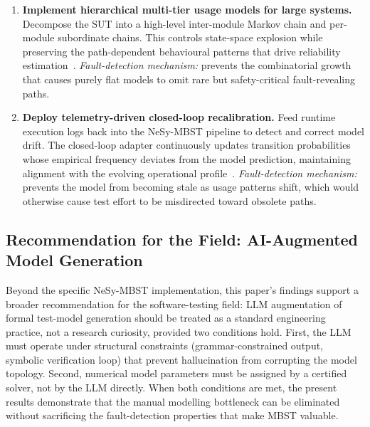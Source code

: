 \begin{enumerate}
    \item \textbf{Implement hierarchical multi-tier usage models for
    large systems.}  Decompose the SUT into a high-level inter-module
    Markov chain and per-module subordinate chains.  This controls
    state-space explosion while preserving the path-dependent
    behavioural patterns that drive reliability
    estimation~\cite{usage_model_web, taxonomy_mbt}.
    \emph{Fault-detection mechanism:} prevents the combinatorial
    growth that causes purely flat models to omit rare but
    safety-critical fault-revealing paths.

    \item \textbf{Deploy telemetry-driven closed-loop recalibration.}
    Feed runtime execution logs back into the NeSy-MBST pipeline to
    detect and correct model drift.  The closed-loop adapter
    continuously updates transition probabilities whose empirical
    frequency deviates from the model prediction, maintaining
    alignment with the evolving operational
    profile~\cite{neurostrata, cps_foundation_models}.
    \emph{Fault-detection mechanism:} prevents the model from
    becoming stale as usage patterns shift, which would otherwise
    cause test effort to be misdirected toward obsolete paths.

\end{enumerate}

\subsection{Recommendation for the Field: AI-Augmented Model Generation}
\label{subsec:field_recommendation}

Beyond the specific NeSy-MBST implementation, this paper's findings
support a broader recommendation for the software-testing field: LLM
augmentation of formal test-model generation should be treated as a
standard engineering practice, not a research curiosity, provided
two conditions hold.  First, the LLM must operate under structural
constraints (grammar-constrained output, symbolic verification loop)
that prevent hallucination from corrupting the model topology.
Second, numerical model parameters must be assigned by a certified
solver, not by the LLM directly.  When both conditions are met, the
present results demonstrate that the manual modelling bottleneck can
be eliminated without sacrificing the fault-detection properties that
make MBST valuable.

